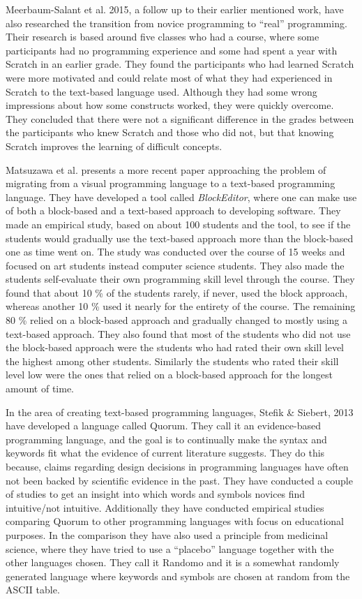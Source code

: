 Meerbaum-Salant et al. 2015\cite{from_scratch_to_real}, a follow up to their earlier mentioned work, have also researched the transition from novice programming to ``real'' programming. Their research is based around five classes who had a course, where some participants had no programming experience and some had spent a year with Scratch in an earlier grade. They found the participants who had learned Scratch were more motivated and could relate most of what they had experienced in Scratch to the text-based language used. Although they had some wrong impressions about how some constructs worked, they were quickly overcome. They concluded that there were not a significant difference in the grades between the participants who knew Scratch and those who did not, but that knowing Scratch improves the learning of difficult concepts.

Matsuzawa et al. \cite{block_editor} presents a more recent paper approaching the problem of migrating from a visual programming language to a text-based programming language. They have developed a tool called \emph{BlockEditor}, where one can make use of both a block-based and a text-based approach to developing software. They made an empirical study, based on about 100 students and the tool, to see if the students would gradually use the text-based approach more than the block-based one as time went on. The study was conducted over the course of 15 weeks and focused on art students instead computer science students. They also made the students self-evaluate their own programming skill level through the course. They found that about 10 \% of the students rarely, if never, used the block approach, whereas another 10 \% used it nearly for the entirety of the course. The remaining 80 \% relied on a block-based approach and gradually changed to mostly using a text-based approach. They also found that most of the students who did not use the block-based approach were the students who had rated their own skill level the highest among other students. Similarly the students who rated their skill level low were the ones that relied on a block-based approach for the longest amount of time.

In the area of creating text-based programming languages, Stefik \& Siebert, 2013\cite{stefik_all_studies} have developed a language called Quorum. They call it an evidence-based programming language, and the goal is to continually make the syntax and keywords fit what the evidence of current literature suggests. They do this because, claims regarding design decisions in programming languages have often not been backed by scientific evidence in the past\cite{ShaneMarkstrum10}. They have conducted a couple of studies to get an insight into which words and symbols novices find intuitive/not intuitive. Additionally they have conducted empirical studies comparing Quorum to other programming languages with focus on educational purposes. In the comparison they have also used a principle from medicinal science, where they have tried to use a ``placebo'' language together with the other languages chosen. They call it Randomo and it is a somewhat randomly generated language where keywords and symbols are chosen at random from the ASCII table.


